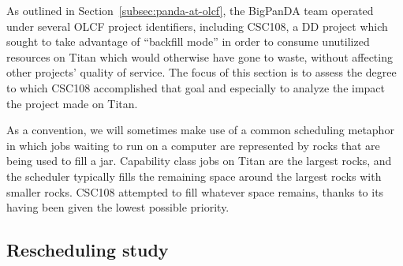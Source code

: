 
%
%


As outlined in Section~\ref{subsec:panda-at-olcf}, the BigPanDA team operated
under several OLCF project identifiers, including CSC108, a DD project which
sought to take advantage of ``backfill mode'' in order to consume unutilized
resources on Titan which would otherwise have gone to waste, without affecting
other projects' quality of service. The focus of this section is to assess the
degree to which CSC108 accomplished that goal and especially to analyze the
impact the project made on Titan.



As a convention, we will sometimes make use of a common scheduling metaphor in
which jobs waiting to run on a computer are represented by rocks that are being
used to fill a jar. Capability class jobs on Titan are the largest rocks, and
the scheduler typically fills the remaining space around the largest rocks
with smaller rocks. CSC108 attempted to fill whatever space remains, thanks
to its having been given the lowest possible priority.

\subsection{Rescheduling study}
\label{subsec:rescheduling-study}

